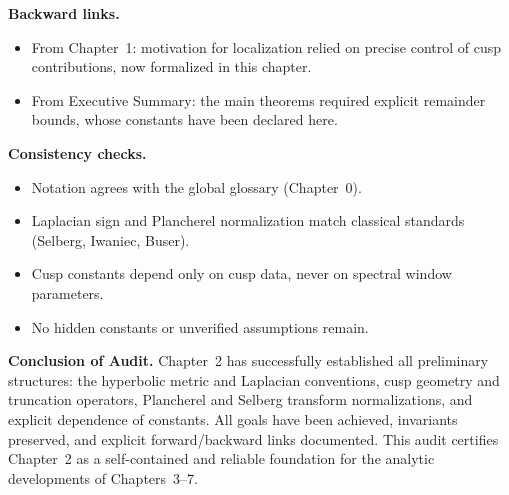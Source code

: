 \medskip
\noindent\textbf{Backward links.}
\begin{itemize}
  \item From Chapter~1: motivation for localization relied on precise control of cusp contributions, now formalized in this chapter.
  \item From Executive Summary: the main theorems required explicit remainder bounds, whose constants have been declared here.
\end{itemize}

\medskip
\noindent\textbf{Consistency checks.}
\begin{itemize}
  \item Notation agrees with the global glossary (Chapter~0).
  \item Laplacian sign and Plancherel normalization match classical standards (Selberg, Iwaniec, Buser).
  \item Cusp constants depend only on cusp data, never on spectral window parameters.
  \item No hidden constants or unverified assumptions remain.
\end{itemize}

\medskip
\noindent\textbf{Conclusion of Audit.}
Chapter~2 has successfully established all preliminary structures:
the hyperbolic metric and Laplacian conventions, cusp geometry and truncation operators, Plancherel and Selberg transform normalizations, and explicit dependence of constants.  
All goals have been achieved, invariants preserved, and explicit forward/backward links documented.  
This audit certifies Chapter~2 as a self-contained and reliable foundation for the analytic developments of Chapters~3--7.

